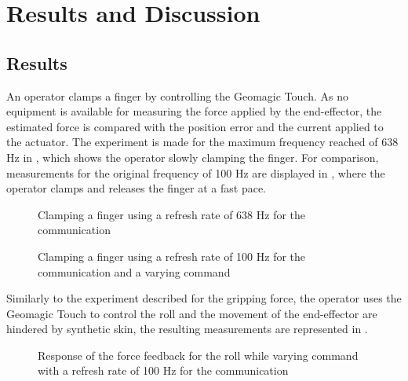 \chapter{Results and Discussion}\label{cha:discussion}





\section{Results}



An operator clamps a finger by controlling the Geomagic Touch. As no equipment is available for measuring the force applied by the end-effector, the estimated force is compared with the position error and the current applied to the actuator. The experiment is made for the maximum frequency reached of 638 Hz in , which shows the operator slowly clamping the finger. For comparison, measurements for the original frequency of 100 Hz are displayed in , where the operator clamps and releases the finger at a fast pace.


\begin{figure}[H]
  
  \caption{Clamping a finger using a refresh rate of 638 Hz for the communication}
  \label{fig:fbkm}
\end{figure}

\begin{figure}[H]
  
  \caption{Clamping a finger using a refresh rate of 100 Hz for the communication and a varying command}
  \label{fig:fbkm_100}
\end{figure}

Similarly to the experiment described for the gripping force, the operator uses the Geomagic Touch to control the roll and the movement of the end-effector are hindered by synthetic skin, the resulting measurements are represented in .
\begin{figure}[H]
  
  \caption{Response of the force feedback for the roll while varying command with a refresh rate of 100 Hz for the communication}
  \label{fig:fbkm_roll_100}
\end{figure}

